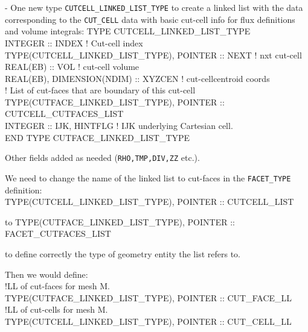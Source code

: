 \documentclass[12pt]{article}
\newenvironment{myfont}{\fontfamily{\ttdefault}\selectfont}{\par}
\begin{document}
\noindent  - One new type \texttt{CUTCELL\_LINKED\_LIST\_TYPE} to create a linked list with the data corresponding to the \texttt{CUT\_CELL} data with basic cut-cell info for flux definitions and volume integrals:
\begin{myfont}
\noindent TYPE CUTCELL\_LINKED\_LIST\_TYPE \\
\indent  INTEGER :: INDEX                                                                        ! Cut-cell index \\
\indent  TYPE(CUTCELL\_LINKED\_LIST\_TYPE), POINTER :: NEXT    ! nxt cut-cell \\
\indent  REAL(EB) :: VOL                                                                           ! cut-cell volume \\
\indent  REAL(EB), DIMENSION(NDIM) :: XYZCEN                                 ! cut-cellcentroid coords \\
\indent  ! List of cut-faces that are boundary of this cut-cell \\
\indent  TYPE(CUTFACE\_LINKED\_LIST\_TYPE), POINTER :: CUTCELL\_CUTFACES\_LIST \\
\indent  INTEGER :: IJK, HINTFLG ! IJK underlying Cartesian cell. \\
\noindent END TYPE CUTFACE\_LINKED\_LIST\_TYPE \\
\end{myfont}
Other fields added as needed (\texttt{RHO,TMP,DIV,ZZ} etc.).

\noindent We need to change the name of the linked list to cut-faces in the \texttt{FACET\_TYPE} definition: \\
\begin{myfont}
\indent   TYPE(CUTCELL\_LINKED\_LIST\_TYPE), POINTER :: CUTCELL\_LIST \\
\end{myfont}
\noindent  to
\begin{myfont}
TYPE(CUTFACE\_LINKED\_LIST\_TYPE), POINTER :: FACET\_CUTFACES\_LIST \\
\end{myfont}
\noindent to define correctly the type of geometry entity the list refers to.

Then we would define: \\
\begin{myfont}
\noindent !LL of cut-faces for mesh M. \\
\noindent TYPE(CUTFACE\_LINKED\_LIST\_TYPE), POINTER :: CUT\_FACE\_LL \\
\noindent !LL of cut-cells for mesh M. \\
\noindent TYPE(CUTCELL\_LINKED\_LIST\_TYPE), POINTER :: CUT\_CELL\_LL \\
\end{myfont}
\end{document}
